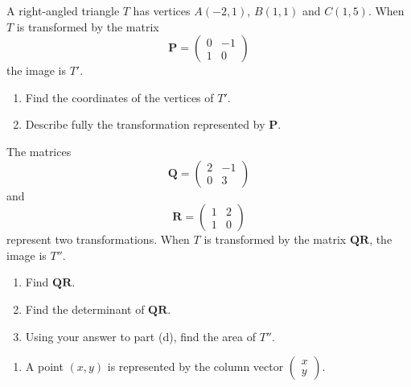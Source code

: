 \documentclass[leqno]{article}
\begin{document}
\begin{enumerate}[
  label=\textbf{\arabic*.},
  leftmargin=*,
  topsep=0pt,
  partopsep=0pt,
  parsep=0pt
]
\newpage

\questionitem

A right-angled triangle $T$ has vertices $A(-2,1)$, $B(1,1)$ and $C(1,5)$. When $T$ is transformed by the matrix
\[
\mathbf{P} = \begin{pmatrix} 0 & -1 \\ 1 & 0 \end{pmatrix}
\]
the image is $T'$. \\

\begin{enumerate}[label=\textbf{(\alph*)}]
  \item Find the coordinates of the vertices of $T'$.  \\
  \item Describe fully the transformation represented by $\mathbf{P}$.  \\
\end{enumerate}

The matrices
\[
\mathbf{Q} = \begin{pmatrix} 2 & -1 \\ 0 & 3 \end{pmatrix}
\]
and
\[
\mathbf{R} = \begin{pmatrix} 1 & 2 \\ 1 & 0 \end{pmatrix}
\]
represent two transformations. When $T$ is transformed by the matrix $\mathbf{QR}$, the image is $T''$. \\

\begin{enumerate}[label=\textbf{(\alph*)}, resume]
  \item Find $\mathbf{QR}$.  \\
  \item Find the determinant of $\mathbf{QR}$.  \\
  \item Using your answer to part (d), find the area of $T''$.  \\
\end{enumerate}

\vspace*{10pt}

\begin{djsSolution}
\begin{enumerate}[label=\textbf{(\alph*)}]
  \item A point \((x,y)\) is represented by the column vector \(\begin{pmatrix}x\\y\end{pmatrix}\).


\end{enumerate}
\end{djsSolution}
\end{enumerate}
\end{document}
